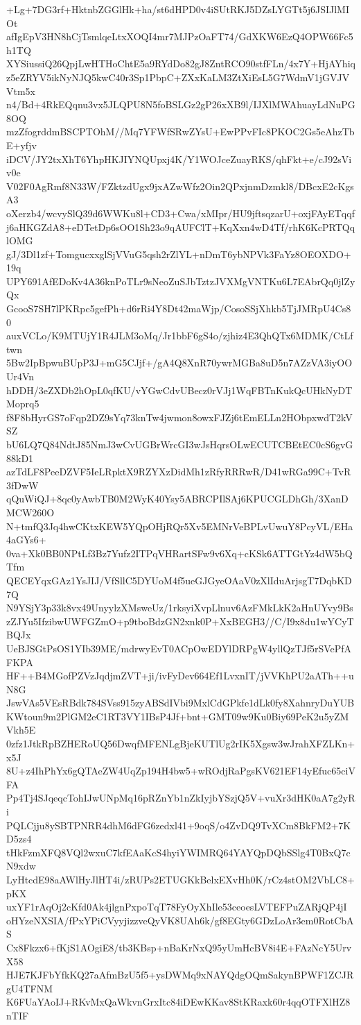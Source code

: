 +Lg+7DG3rf+HktnbZGGlHk+ha/st6dHPD0v4iSUtRKJ5DZsLYGTt5j6JSIJlMIOt
afIgEpV3HN8hCjTsmlqeLtxXOQI4mr7MJPzOaFT74/GdXKW6EzQ4OPW66Fc5h1TQ
XYSiussiQ26QpjLwHTHoChtE5a9RYdDo82gJ8ZntRCO90stfFLn/4x7Y+HjAYhiq
z5eZRYV5ikNyNJQ5kwC40r3Sp1PbpC+ZXxKaLM3ZtXiEsL5G7WdmV1jGVJVVtm5x
n4/Bd+4RkEQqnu3vx5JLQPU8N5foBSLGz2gP26xXB9l/IJXlMWAhuayLdNuPG8OQ
mzZfogrddmBSCPTOhM//Mq7YFWfSRwZYsU+EwPPvFIc8PKOC2Gs5eAhzTbE+yfjv
iDCV/JY2txXhT6YhpHKJIYNQUpxj4K/Y1WOJceZuayRKS/qhFkt+e/cJ92sViv0e
V02F0AgRmf8N33W/FZktzdUgx9jxAZwWfz2Oin2QPxjnmDzmkl8/DBcxE2cKgsA3
oXerzb4/wcvySlQ39d6WWKu8l+CD3+Cwa/xMIpr/HU9jftsqzarU+oxjFAyETqqf
j6aHKGZdA8+eDTetDp6sOO1Sh23o9qAUFClT+KqXxn4wD4Tf/rhK6KcPRTQqlOMG
gJ/3Dl1zf+TomgucxxglSjVVuG5qsh2rZlYL+nDmT6ybNPVk3FaYz8OEOXDO+19q
UPY691AfEDoKv4A36knPoTLr9sNeoZuSJbTztzJVXMgVNTKu6L7EAbrQq0jlZyQx
GcooS7SH7lPKRpc5gefPh+d6rRi4Y8Dt42maWjp/CosoSSjXhkb5TjJMRpU4Cs80
auxVCLo/K9MTUjY1R4JLM3oMq/Jr1bbF6gS4o/zjhiz4E3QhQTx6MDMK/CtLftwn
5Bw2IpBpwuBUpP3J+mG5CJjf+/gA4Q8XnR70ywrMGBa8uD5n7AZzVA3iyOOUr4Vn
hDDH/3eZXDb2hOpL0qfKU/vYGwCdvUBecz0rVJj1WqFBTnKukQcUHkNyDTMoprq5
f8F8bHyrGS7oFqp2DZ9sYq73knTw4jwmon8owxFJZj6tEmELLn2HObpxwdT2kVSZ
bU6LQ7Q84NdtJ85NmJ3wCvUGBrWrcGI3wJsHqrsOLwECUTCBEtEC0cS6gvG88kD1
azTdLF8PeeDZVF5IeLRpktX9RZYXzDidMh1zRfyRRRwR/D41wRGa99C+TvR3fDwW
qQuWiQJ+8qc0yAwbTB0M2WyK40Ysy5ABRCPIlSAj6KPUCGLDhGh/3XanDMCW260O
N+tmfQ3Jq4hwCKtxKEW5YQpOHjRQr5Xv5EMNrVeBPLvUwuY8PcyVL/EHa4aGYs6+
0va+Xk0BB0NPtLf3Bz7Yufz2ITPqVHRartSFw9v6Xq+cKSk6ATTGtYz4dW5bQTfm
QECEYqxGAz1YsJIJ/VfSllC5DYUoM4f5ueGJGyeOAaV0zXlIduArjsgT7DqbKD7Q
N9YSjY3p33k8vx49UnyylzXMsweUz/1rksyiXvpLlnuv6AzFMkLkK2aHnUYvy9Bs
zZJYu5IfzibwUWFGZmO+p9tboBdzGN2xnk0P+XxBEGH3//C/I9x8du1wYCyTBQJx
UeBJSGtPsOS1YIb39ME/mdrwyEvT0ACpOwEDYlDRPgW4yllQzTJf5rSVePfAFKPA
HF++B4MGofPZVzJqdjmZVT+ji/ivFyDev664Ef1LvxnIT/jVVKhPU2aATh++uN8G
JswVAs5VEsRBdk784SVss915zyABSdIVbi9MxlCdGPkfe1dLk0fy8XahnryDuYUB
KWtoun9m2PlGM2eC1RT3VY1IBsP4Jf+bnt+GMT09w9Ku0Biy69PeK2u5yZMVkh5E
0zfz1JtkRpBZHERoUQ56DwqfMFENLgBjeKUTlUg2rIK5Xgsw3wJrahXFZLKn+x5J
8U+z4IhPhYx6gQTAeZW4UqZp194H4bw5+wROdjRaPgsKV621EF14yEfuc65ciVFA
Pp4Tj4SJqeqcTohIJwUNpMq16pRZnYb1nZkIyjbYSzjQ5V+vuXr3dHK0aA7g2yRi
PQLCjju8ySBTPNRR4dhM6dFG6zedxl41+9oqS/o4ZvDQ9TvXCm8BkFM2+7KD5zs4
tHkFzmXFQ8VQl2wxuC7kfEAaKcS4hyiYWIMRQ64YAYQpDQbSSlg4T0BxQ7cN9xdw
LyHtcdE98aAWlHyJlHT4i/zRUPs2ETUGKkBelxEXvHh0K/rCz4stOM2VbLC8+pKX
uxYF1rAqOj2cKfd0Ak4jlgnPxpoTqT78FyOyXhIle53ceoesLVTEFPuZARjQP4jI
oHYzeNXSIA/fPxYPiCVyyjizzveQyVK8UAh6k/gf8EGty6GDzLoAr3em0RotCbAS
Cx8Fkzx6+fKjS1AOgiE8/tb3KBsp+nBaKrNxQ95yUmHcBV8i4E+FAzNcY5UrvX58
HJE7KJFbYfkKQ27aAfmBzU5f5+ysDWMq9xNAYQdgOQmSakynBPWF1ZCJRgU4TFNM
K6FUaYAoIJ+RKvMxQaWkvnGrxItc84iDEwKKav8StKRaxk60r4qqOTFXlHZ8nTIF

